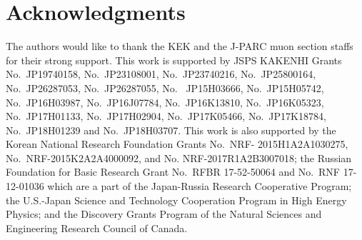 \section*{Acknowledgments}
The authors would like to thank the KEK and the J-PARC muon section staffs for their strong support.
This work is supported by JSPS KAKENHI Grants No.~JP19740158, No.~JP23108001, No.~JP23740216, No.~JP25800164, No.~JP26287053, No.~JP26287055, No.~ JP15H03666, No.~JP15H05742, No.~JP16H03987, No.~JP16J07784, No.~JP16K13810, No.~JP16K05323, No.~JP17H01133, No.~JP17H02904, No.~JP17K05466, No.~JP17K18784, No.~JP18H01239 and No.~JP18H03707. 
This work is also supported by the Korean National Research Foundation Grants No.~NRF- 2015H1A2A1030275, No.~NRF-2015K2A2A4000092, and No. NRF-2017R1A2B3007018; 
the Russian Foundation for Basic Research Grant No.~RFBR 17-52-50064 and No.~RNF 17-12-01036 which are a part of the Japan-Russia Research Cooperative Program;
the U.S.-Japan Science and Technology Cooperation Program in High Energy Physics;
and the Discovery Grants Program of the Natural Sciences and Engineering Research Council of Canada.
